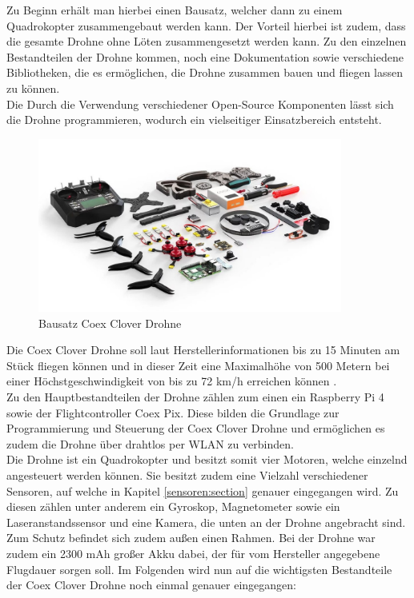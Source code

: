 Zu Beginn erhält man hierbei einen Bausatz, welcher dann zu einem Quadrokopter zusammengebaut werden kann. Der Vorteil hierbei ist zudem, dass die gesamte Drohne ohne Löten zusammengesetzt werden kann. Zu den einzelnen Bestandteilen der Drohne kommen, noch eine Dokumentation sowie verschiedene Bibliotheken, die es ermöglichen, die Drohne zusammen bauen und fliegen lassen zu können. \\
Die 
Durch die Verwendung verschiedener Open-Source Komponenten lässt sich die Drohne programmieren, wodurch ein vielseitiger Einsatzbereich entsteht.\\

\begin{figure}[htpb]
    \centering
    \includegraphics[width=10cm,keepaspectratio,angle=0]{images/coex_clover_kit.jpg}
    \caption[Bausatz Coex Clover Drohne]{\label{img coex_clover_kit} Bausatz Coex Clover Drohne \cite{img_coex_clover_kit}}
\end{figure}

Die Coex Clover Drohne soll laut Herstellerinformationen bis zu 15 Minuten am Stück fliegen können und in dieser Zeit eine Maximalhöhe von 500 Metern bei einer Höchstgeschwindigkeit von bis zu 72 km/h erreichen können \cite[vgl.][]{coex_clover}.\\

Zu den Hauptbestandteilen der Drohne zählen zum einen ein Raspberry Pi 4 sowie der Flightcontroller Coex Pix. Diese bilden die Grundlage zur Programmierung und Steuerung der Coex Clover Drohne und ermöglichen es zudem die Drohne über drahtlos per WLAN zu verbinden. \\
Die Drohne ist ein Quadrokopter und besitzt somit vier Motoren, welche einzelnd angesteuert werden können. Sie besitzt zudem eine Vielzahl verschiedener Sensoren, auf welche in Kapitel \ref{sensoren:section} genauer eingegangen wird. Zu diesen zählen unter anderem ein Gyroskop, Magnetometer sowie ein Laseranstandssensor und eine Kamera, die unten an der Drohne angebracht sind.
Zum Schutz befindet sich zudem außen einen Rahmen.
Bei der Drohne war zudem ein 2300 mAh großer Akku dabei, der für vom Hersteller angegebene Flugdauer sorgen soll.
Im Folgenden wird nun auf die wichtigsten Bestandteile der Coex Clover Drohne noch einmal genauer eingegangen:

